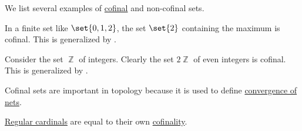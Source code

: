\begin{example}\label{ex:def:cofinal_set}
  We list several examples of \hyperref[def:cofinal_set]{cofinal} and non-cofinal sets.

  \begin{itemize}
     In a finite set like \( \set{ 0, 1, 2 } \), the set \( \set{ 2 } \) containing the maximum is cofinal. This is generalized by .

     Consider the set \( \BbbZ \) of integers. Clearly the set \( 2\BbbZ \) of even integers is cofinal. This is generalized by .

     Cofinal sets are important in topology because it is used to define \hyperref[def:net_convergence]{convergence of nets}.

     \hyperref[def:regular_cardinal]{Regular cardinals} are equal to their own \hyperref[def:cofinality]{cofinality}.
  \end{itemize}
\end{example}

